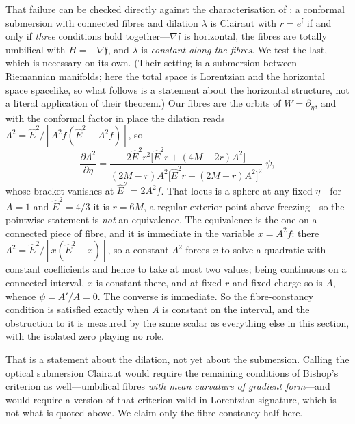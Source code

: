 \documentclass[12pt]{iopart}
\theoremstyle{plain}
\theoremstyle{definition}
\theoremstyle{remark}
\newcommand{\Ehat}{\hat E}
\begin{document}
That failure can be checked directly against the characterisation of
\cite{MeenaZawadzki2024}: a conformal submersion with connected fibres and
dilation $\lambda$ is Clairaut with $r=e^{\mathfrak f}$ if and only if
\emph{three} conditions hold together---$\nabla\mathfrak f$ is horizontal, the
fibres are totally umbilical with $H=-\nabla\mathfrak f$, and $\lambda$ is
\emph{constant along the fibres}. We test the last, which is necessary on its
own. (Their setting is a submersion between Riemannian manifolds; here the total
space is Lorentzian and the horizontal space spacelike, so what follows is a
statement about the horizontal structure, not a literal application of their
theorem.) Our fibres are the orbits of
$W=\partial_\eta$, and with the conformal factor in place the dilation reads
$\Lambda^2=\Ehat^2/[A^2f(\Ehat^2-A^2f)]$, so
\begin{equation}
    \frac{\partial\Lambda^2}{\partial\eta}
      =\frac{2\Ehat^2r^2\big[\Ehat^2r+(4M-2r)A^2\big]}
             {(2M-r)A^2\big[\Ehat^2r+(2M-r)A^2\big]^2}\;\psi ,
    \label{eq:dilation-fibre}
\end{equation}
whose bracket vanishes at $\Ehat^2=2A^2f$. That locus is a sphere at any fixed
$\eta$---for $A=1$ and $\Ehat^2=4/3$ it is $r=6M$, a regular exterior point above
freezing---so the pointwise statement is \emph{not} an equivalence. The equivalence
is the one on a connected piece of fibre, and it is immediate in the variable
$x=A^2f$: there $\Lambda^2=\Ehat^2/[x(\Ehat^2-x)]$, so a constant $\Lambda^2$ forces
$x$ to solve a quadratic with constant coefficients and hence to take at most two
values; being continuous on a connected interval, $x$ is constant there, and at
fixed $r$ and fixed charge so is $A$, whence $\psi=A'/A=0$. The converse is
immediate. So the fibre-constancy condition is satisfied exactly when $A$ is
constant on the interval, and the obstruction to it is measured by the same scalar
as everything else in this section, with the isolated zero playing no role.

That is a statement about the dilation, not yet about the submersion. Calling the
optical submersion Clairaut would require the remaining conditions of Bishop's
criterion as well---umbilical fibres \emph{with mean curvature of gradient
form}---and would require a version of that criterion valid in Lorentzian
signature, which is not what is quoted above. We claim only the fibre-constancy
half here.
\end{document}
